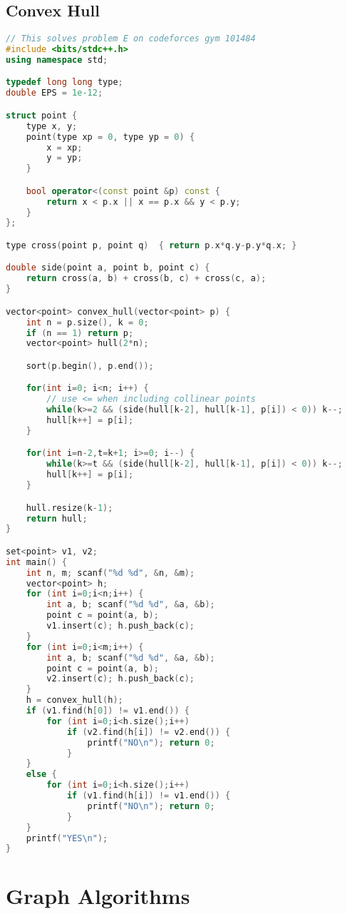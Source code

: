 \documentclass{article}
\begin{document}
\subsection{Convex Hull}
\begin{lstlisting}[language=C++]
// This solves problem E on codeforces gym 101484
#include <bits/stdc++.h>
using namespace std;

typedef long long type;
double EPS = 1e-12;

struct point {
    type x, y;
    point(type xp = 0, type yp = 0) {
        x = xp;
        y = yp;
    }

    bool operator<(const point &p) const {
		return x < p.x || x == p.x && y < p.y;
	}
};

type cross(point p, point q)  { return p.x*q.y-p.y*q.x; }

double side(point a, point b, point c) {
    return cross(a, b) + cross(b, c) + cross(c, a);
}

vector<point> convex_hull(vector<point> p) {
    int n = p.size(), k = 0;
    if (n == 1) return p;
    vector<point> hull(2*n);

    sort(p.begin(), p.end());

    for(int i=0; i<n; i++) {
		// use <= when including collinear points
        while(k>=2 && (side(hull[k-2], hull[k-1], p[i]) < 0)) k--;
        hull[k++] = p[i];
    }

    for(int i=n-2,t=k+1; i>=0; i--) {
        while(k>=t && (side(hull[k-2], hull[k-1], p[i]) < 0)) k--;
        hull[k++] = p[i];
    }

    hull.resize(k-1);
    return hull;
}

set<point> v1, v2;
int main() {
	int n, m; scanf("%d %d", &n, &m);
	vector<point> h;
	for (int i=0;i<n;i++) {
		int a, b; scanf("%d %d", &a, &b);
		point c = point(a, b);
		v1.insert(c); h.push_back(c);
	}
	for (int i=0;i<m;i++) {
		int a, b; scanf("%d %d", &a, &b);
		point c = point(a, b);
		v2.insert(c); h.push_back(c);
	}
	h = convex_hull(h);
	if (v1.find(h[0]) != v1.end()) {
		for (int i=0;i<h.size();i++)
			if (v2.find(h[i]) != v2.end()) {
				printf("NO\n"); return 0;
			}
	}
	else {
		for (int i=0;i<h.size();i++)
			if (v1.find(h[i]) != v1.end()) {
				printf("NO\n"); return 0;
			}
	}
	printf("YES\n");
}
\end{lstlisting}
\section{Graph Algorithms}
\end{document}
